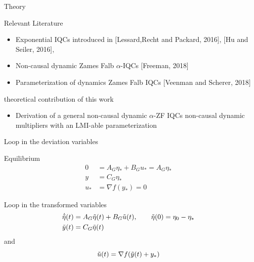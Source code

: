 \documentclass{beamer}
\begin{document}
\begin{frame}{Theory}
	\begin{block}{Relevant Literature}
		\begin{itemize}
			\item Exponential IQCs introduced in [Lessard,Recht and Packard, 2016], [Hu and Seiler, 2016], 
			\item Non-causal dynamic Zames Falb $\alpha$-IQCs [Freeman, 2018] 
			\item Parameterization of dynamics Zames Falb IQCs [Veenman and Scherer, 2018] 
		\end{itemize}
	\end{block}	
	\begin{block}{theoretical contribution of this work}
	\begin{itemize}
		\item Derivation of a general non-causal dynamic $\alpha$-ZF IQCs
		non-causal dynamic multipliers with an LMI-able parameterization
	\end{itemize}
\end{block}	
\end{frame}
\begin{frame}{Loop in the deviation variables}
	\begin{block}{Equilibrium}
		\begin{equation} \label{eq:sys_dyn_G_delta}
			\begin{split}
				0&=A_G\eta_* + B_G u_*=A_G\eta_*\\
				y&=C_G \eta_*\\
				u_*&=\nabla f(y_*)=0
			\end{split}
		\end{equation}
	\end{block}
	\begin{block}{Loop in the transformed variables}
		\begin{equation} \label{eq:sys_dyn_G_tilde}
			\begin{split}
				\Dot{\Tilde{\eta}}(t)&=A_G\Tilde{\eta}(t) + B_G \Tilde{u}(t), \quad \quad \Tilde{\eta}(0)=\eta_0-\eta_*\\
				\Tilde{y}(t)&=C_G \Tilde{\eta}(t)
			\end{split}
		\end{equation}
		and 
		\begin{equation} \label{eq:delta}
			\Tilde{u}(t)=\nabla f(\Tilde{y}(t)+y_*)
		\end{equation}
	\end{block}
\end{frame}
\end{document}
